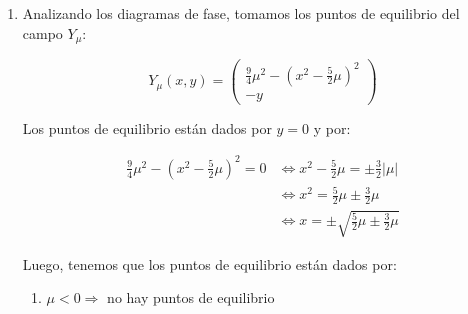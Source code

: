\begin{exmp}
\begin{enumerate}
		Sabemos que $K\subseteq \overline{B_1(0)}$, de donde $|x| \leq \sqrt{x^2+y^2} = ||(x,y)||\leq 1 , \forall (x,y) \in K$. De donde se cumple: 
		
		\begin{align*}
			||Y_\mu - X||_{2} &\leq 5|\mu| \max\bigg\{ \max_{(x,y) \in K} |
			x^2| +  \frac{4}{5} |\mu| ;
			2\max_{(x,y)\in K} |x|; 2\bigg\} \\
			&\leq 5|\mu| \max\bigg\{ 1 +  \frac{4}{5} |\mu| ;
			2; 2\bigg\} \\
			&\leq 5|\mu| \max\bigg\{ 1 +  \frac{4}{5} |\mu| ; 2 \bigg\} \\
		\end{align*}
		
		Luego tomando $|\mu| < \min\{\frac{\epsilon}{10},1\}$:
		
		\begin{align*}
			||Y_\mu - X||_{2} &\leq 5|\mu| \max\bigg\{ 1 +  \frac{4}{5} |\mu| ; 2 \bigg\} \\
			&\leq 5|\mu| \max\bigg\{\frac{9}{5}  ; 2 \bigg\} \leq  10|\mu| < \epsilon
		\end{align*}
		
		Luego son arbitrariamente cercanos.
		
		\item Analizando los diagramas de fase, tomamos los puntos de equilibrio del campo $Y_\mu$:
		
		\begin{equation*}
			Y_\mu(x,y) = \begin{pmatrix}
				\frac{9}{4}\mu^2 -(x^2 - \frac{5}{2}\mu)^2 \\
				-y
			\end{pmatrix}
		\end{equation*}
		
		Los puntos de equilibrio están dados por $y = 0$ y por:
		
		\begin{align*}
			\frac{9}{4}\mu^2 -(x^2 - \frac{5}{2}\mu)^2 = 0 &\iff  x^2  -\frac{5}{2}\mu = \pm \frac{3}{2}|\mu| \\
			&\iff  x^2  = \frac{5}{2}\mu \pm  \frac{3}{2}\mu \\
			&\iff  x  = \pm\sqrt{\frac{5}{2}\mu \pm  \frac{3}{2}\mu} 
		\end{align*}
		
		Luego, tenemos que los puntos de equilibrio están dados por:
		
		\begin{enumerate}
			\item $\mu < 0 \Rightarrow $ no hay puntos de equilibrio
			

\end{enumerate}
\end{enumerate}
\end{exmp}
